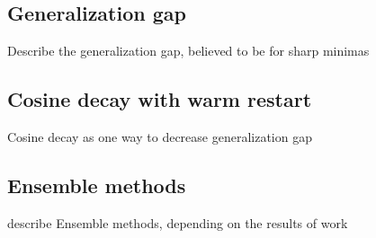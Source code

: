 \subsection{Generalization gap}
Describe the generalization gap, believed to be for sharp minimas
\subsection{Cosine decay with warm restart}
Cosine decay as one way to decrease generalization gap
\subsection{Ensemble methods}
describe Ensemble methods, depending on the results of work









